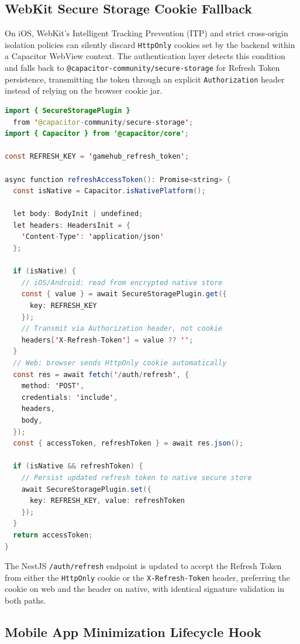 \documentclass[11pt,a4paper]{report}
\begin{document}
\subsection{WebKit Secure Storage Cookie Fallback}

On iOS, WebKit's Intelligent Tracking Prevention (ITP) and strict cross-origin isolation policies can silently discard \texttt{HttpOnly} cookies set by the backend within a Capacitor WebView context. The authentication layer detects this condition and falls back to \texttt{@capacitor-community/secure-storage} for Refresh Token persistence, transmitting the token through an explicit \texttt{Authorization} header instead of relying on the browser cookie jar.

\begin{lstlisting}[language=Java, caption={WebKit cookie fallback to SecureStorage}]
import { SecureStoragePlugin }
  from '@capacitor-community/secure-storage';
import { Capacitor } from '@capacitor/core';

const REFRESH_KEY = 'gamehub_refresh_token';

async function refreshAccessToken(): Promise<string> {
  const isNative = Capacitor.isNativePlatform();

  let body: BodyInit | undefined;
  let headers: HeadersInit = {
    'Content-Type': 'application/json'
  };

  if (isNative) {
    // iOS/Android: read from encrypted native store
    const { value } = await SecureStoragePlugin.get({
      key: REFRESH_KEY
    });
    // Transmit via Authorization header, not cookie
    headers['X-Refresh-Token'] = value ?? '';
  }
  // Web: browser sends HttpOnly cookie automatically
  const res = await fetch('/auth/refresh', {
    method: 'POST',
    credentials: 'include',
    headers,
    body,
  });
  const { accessToken, refreshToken } = await res.json();

  if (isNative && refreshToken) {
    // Persist updated refresh token to native secure store
    await SecureStoragePlugin.set({
      key: REFRESH_KEY, value: refreshToken
    });
  }
  return accessToken;
}
\end{lstlisting}

The NestJS \texttt{/auth/refresh} endpoint is updated to accept the Refresh Token from either the \texttt{HttpOnly} cookie or the \texttt{X-Refresh-Token} header, preferring the cookie on web and the header on native, with identical signature validation in both paths.

\subsection{Mobile App Minimization Lifecycle Hook}
\end{document}
